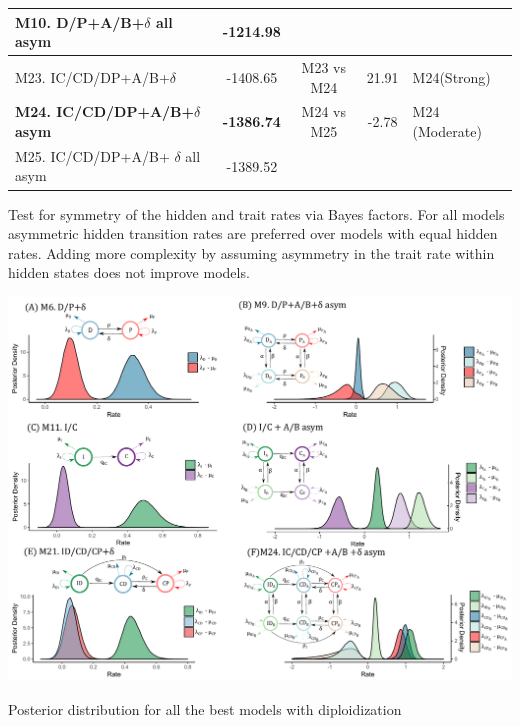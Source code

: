 \begin{supptable}
\begin{tabular}{|l|c|c|c|l|}
M10. D/P+A/B+$\delta$ all asym        & -1214.98                     &                    &                         &                         \\ \hline
M23. IC/CD/DP+A/B+$\delta$                 & -1408.65                     &     M23 vs M24                & 21.91                   & M24(Strong)     \\
\textbf{M24. IC/CD/DP+A/B+$\delta$ asym} & \textbf{-1386.74}                     &   M24 vs M25              & -2.78                   & M24 (Moderate) \\
M25. IC/CD/DP+A/B+ $\delta$ all asym     & -1389.52                     &                     &                         &                         \\ \hline
\end{tabular}
\caption{Test for symmetry of the hidden and trait rates via Bayes factors. For all models asymmetric hidden transition rates are preferred over models with equal hidden rates. Adding more complexity by assuming asymmetry in the trait rate within hidden states does not improve models.}
\label{supptable:asymmetry}
\end{supptable}




\begin{suppfigure}
\includegraphics[width=\textwidth]{alldiversificationasymhiddendip.pdf}
\caption{Posterior distribution for all the best models with diploidization} %
\label{suppfigure:alldip}
\end{suppfigure}

